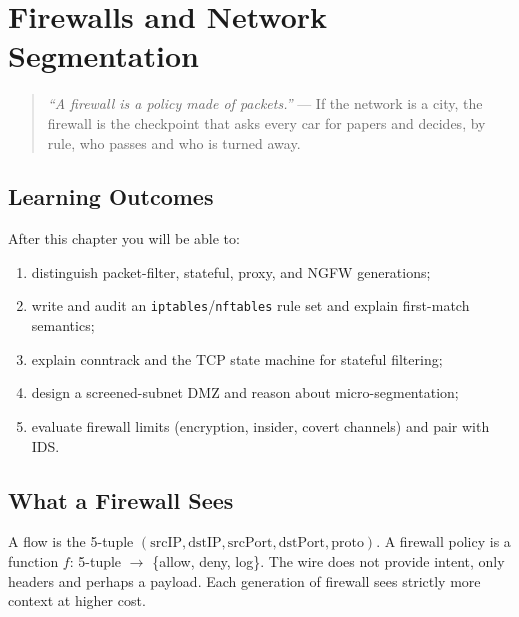 \chapter{Firewalls and Network Segmentation}\label{ch:firewall}
\sloppy

\begin{quote}
\emph{``A firewall is a policy made of packets.''} --- If the network is a
city, the firewall is the checkpoint that asks every car for papers and
decides, by rule, who passes and who is turned away.
\end{quote}

\noindent{}
\vspace{0.4em}

\section*{Learning Outcomes}
After this chapter you will be able to:
\begin{enumerate}[label=(L\arabic*)]
    \item distinguish packet-filter, stateful, proxy, and NGFW generations;
    \item write and audit an \texttt{iptables}/\texttt{nftables} rule set and explain first-match semantics;
    \item explain conntrack and the TCP state machine for stateful filtering;
    \item design a screened-subnet DMZ and reason about micro-segmentation;
    \item evaluate firewall limits (encryption, insider, covert channels) and pair with IDS.
\end{enumerate}

\section{What a Firewall Sees}\label{sec:what-firewall-sees}
A flow is the 5-tuple
$(\text{srcIP},\text{dstIP},\text{srcPort},\text{dstPort},\text{proto})$.
A firewall policy is a function $f$: 5-tuple $\to$ \{allow, deny, log\}.
The wire does not provide intent, only headers and perhaps a payload. Each
generation of firewall sees strictly more context at higher cost.

